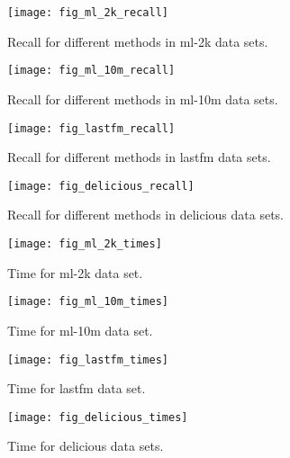 \documentclass[letterpaper]{article}
\begin{document}
\begin{figure}[ht]
  \centering
  \texttt{[image: fig\_ml\_2k\_recall]}\\
  \caption{Recall for different methods in ml-2k data sets.}
  \label{fig:ml_2k_recall}
\end{figure}
\begin{figure}[ht]
  \centering
  \texttt{[image: fig\_ml\_10m\_recall]}\\
  \caption{Recall for different methods in ml-10m data sets.}
  \label{fig:ml_10m_recall}
\end{figure}


\begin{figure}[ht]
  \centering
  \texttt{[image: fig\_lastfm\_recall]}\\
  \caption{Recall for different methods in lastfm data sets.}
  \label{fig:lastfm_recall}
\end{figure}
\begin{figure}[ht]
  \centering
  \texttt{[image: fig\_delicious\_recall]}\\
  \caption{Recall for different methods in delicious data sets.}
  \label{fig:delicious_recall}
\end{figure}

\begin{figure}[ht]
  \centering
  \texttt{[image: fig\_ml\_2k\_times]}\\
  \caption{Time for ml-2k data set.}
  \label{fig:ml_2k_times}
\end{figure}
\begin{figure}[ht]
  \centering
  \texttt{[image: fig\_ml\_10m\_times]}\\
  \caption{Time for ml-10m data set.}
  \label{fig:ml_10m_times}
\end{figure}
\begin{figure}[ht]
  \centering
  \texttt{[image: fig\_lastfm\_times]}\\
  \caption{Time for lastfm data set.}
  \label{fig:lastfm_times}
\end{figure}
\begin{figure}[ht]
  \centering
  \texttt{[image: fig\_delicious\_times]}\\
  \caption{Time for delicious data sets.}
  \label{fig:delicious_times}
\end{figure}
\end{document}
